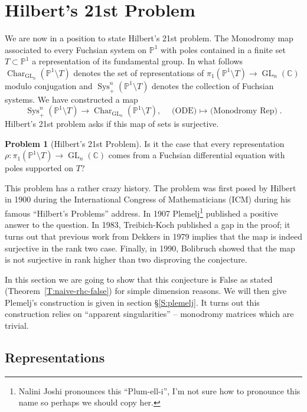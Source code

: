 \documentclass[12pt]{book}
\numberwithin{equation}{section}
\theoremstyle{definition}
\newtheorem{problem}[theorem]{Problem}
\theoremstyle{remark}
\newcommand{\CC}{\mathbb{C}}
\newcommand{\PP}{\mathbb{P}}
\newcommand{\GL}{\operatorname{GL}}
\newcommand{\Sys}{\operatorname{Sys}}
\newcommand{\Char}{\operatorname{Char}}
\begin{document}
\section{Hilbert's 21st Problem}
We are now in a position to state Hilbert's 21st problem. 
The Monodromy map associated to every Fuchsian system on $\PP^1$ with poles contained in a finite set $T \subset \PP^1$ a representation of its fundamental group. 
In what follows $\Char_{\GL_n}(\PP^1\setminus T)$ denotes the set of representations of $\pi_1(\PP^1\setminus T) \to \GL_n(\CC)$ modulo conjugation and $\Sys_+^n(\PP^1\setminus T)$ denotes the collection of Fuchsian systems.
We have constructed a map
$$ \Sys_+^n(\PP^1\setminus T)  \to \Char_{\GL_n}(\PP^1\setminus T), \quad \mbox{(ODE) $\mapsto$ (Monodromy Rep)}.$$
Hilbert's 21st problem asks if this map of sets is surjective. 
\begin{problem}[Hilbert's 21st Problem]
	Is it the case that every representation $\rho:\pi_1(\PP^1\setminus T) \to \GL_n(\CC)$ comes from a Fuchsian differential equation with poles supported on $T$?
\end{problem}
This problem has a rather crazy history. 
The problem was first posed by Hilbert in 1900 during the International Congress of Mathematicians (ICM) during his famous ``Hilbert's Problems'' address.
In 1907 Plemelj\footnote{Nalini Joshi pronounces this ``Plum-ell-i'', I'm not sure how to pronounce this name so perhaps we should copy her.} published a positive answer to the question. 
In 1983, Treibich-Koch published a gap in the proof; it turns out that previous work from Dekkers in 1979 implies that the map is indeed surjective in the rank two case. 
Finally, in 1990, Bolibruch showed that the map is not surjective in rank higher than two disproving the conjecture.

In this section we are going to show that this conjecture is False as stated (Theorem~\ref{T:naive-rhc-false}) for simple dimension reasons.
We will then give Plemelj's construction is given in section \S\ref{S:plemelj}.
It turns out this construction relies on ``apparent singularities'' -- monodromy matrices which are trivial.

\subsection{Representations}
\end{document}
